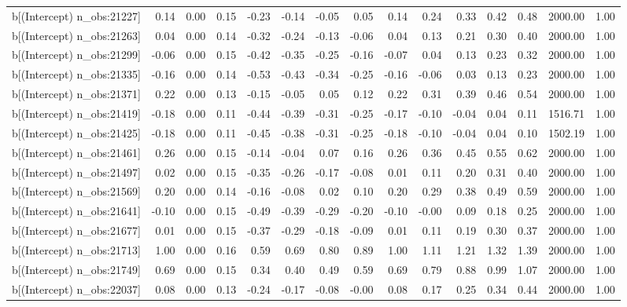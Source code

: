 \begin{table}[ht]
\begin{tabular}{rrrrrrrrrrrrrrr}
  b[(Intercept) n\_obs:21227] & 0.14 & 0.00 & 0.15 & -0.23 & -0.14 & -0.05 & 0.05 & 0.14 & 0.24 & 0.33 & 0.42 & 0.48 & 2000.00 & 1.00 \\ 
  b[(Intercept) n\_obs:21263] & 0.04 & 0.00 & 0.14 & -0.32 & -0.24 & -0.13 & -0.06 & 0.04 & 0.13 & 0.21 & 0.30 & 0.40 & 2000.00 & 1.00 \\ 
  b[(Intercept) n\_obs:21299] & -0.06 & 0.00 & 0.15 & -0.42 & -0.35 & -0.25 & -0.16 & -0.07 & 0.04 & 0.13 & 0.23 & 0.32 & 2000.00 & 1.00 \\ 
  b[(Intercept) n\_obs:21335] & -0.16 & 0.00 & 0.14 & -0.53 & -0.43 & -0.34 & -0.25 & -0.16 & -0.06 & 0.03 & 0.13 & 0.23 & 2000.00 & 1.00 \\ 
  b[(Intercept) n\_obs:21371] & 0.22 & 0.00 & 0.13 & -0.15 & -0.05 & 0.05 & 0.12 & 0.22 & 0.31 & 0.39 & 0.46 & 0.54 & 2000.00 & 1.00 \\ 
  b[(Intercept) n\_obs:21419] & -0.18 & 0.00 & 0.11 & -0.44 & -0.39 & -0.31 & -0.25 & -0.17 & -0.10 & -0.04 & 0.04 & 0.11 & 1516.71 & 1.00 \\ 
  b[(Intercept) n\_obs:21425] & -0.18 & 0.00 & 0.11 & -0.45 & -0.38 & -0.31 & -0.25 & -0.18 & -0.10 & -0.04 & 0.04 & 0.10 & 1502.19 & 1.00 \\ 
  b[(Intercept) n\_obs:21461] & 0.26 & 0.00 & 0.15 & -0.14 & -0.04 & 0.07 & 0.16 & 0.26 & 0.36 & 0.45 & 0.55 & 0.62 & 2000.00 & 1.00 \\ 
  b[(Intercept) n\_obs:21497] & 0.02 & 0.00 & 0.15 & -0.35 & -0.26 & -0.17 & -0.08 & 0.01 & 0.11 & 0.20 & 0.31 & 0.40 & 2000.00 & 1.00 \\ 
  b[(Intercept) n\_obs:21569] & 0.20 & 0.00 & 0.14 & -0.16 & -0.08 & 0.02 & 0.10 & 0.20 & 0.29 & 0.38 & 0.49 & 0.59 & 2000.00 & 1.00 \\ 
  b[(Intercept) n\_obs:21641] & -0.10 & 0.00 & 0.15 & -0.49 & -0.39 & -0.29 & -0.20 & -0.10 & -0.00 & 0.09 & 0.18 & 0.25 & 2000.00 & 1.00 \\ 
  b[(Intercept) n\_obs:21677] & 0.01 & 0.00 & 0.15 & -0.37 & -0.29 & -0.18 & -0.09 & 0.01 & 0.11 & 0.19 & 0.30 & 0.37 & 2000.00 & 1.00 \\ 
  b[(Intercept) n\_obs:21713] & 1.00 & 0.00 & 0.16 & 0.59 & 0.69 & 0.80 & 0.89 & 1.00 & 1.11 & 1.21 & 1.32 & 1.39 & 2000.00 & 1.00 \\ 
  b[(Intercept) n\_obs:21749] & 0.69 & 0.00 & 0.15 & 0.34 & 0.40 & 0.49 & 0.59 & 0.69 & 0.79 & 0.88 & 0.99 & 1.07 & 2000.00 & 1.00 \\ 
  b[(Intercept) n\_obs:22037] & 0.08 & 0.00 & 0.13 & -0.24 & -0.17 & -0.08 & -0.00 & 0.08 & 0.17 & 0.25 & 0.34 & 0.44 & 2000.00 & 1.00 \\ 

\end{tabular}
\end{table}
